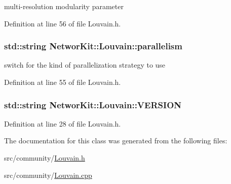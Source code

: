 multi-\/resolution modularity parameter 



Definition at line 56 of file Louvain.\-h.

\hypertarget{class_networ_kit_1_1_louvain_ad690b266426199e76caefd234ea53397}{
\subsubsection[{parallelism}]{\setlength{\rightskip}{0pt plus 5cm}std\-::string Networ\-Kit\-::\-Louvain\-::parallelism\hspace{0.3cm}{\ttfamily [protected]}}}\label{class_networ_kit_1_1_louvain_ad690b266426199e76caefd234ea53397}


switch for the kind of parallelization strategy to use 



Definition at line 55 of file Louvain.\-h.

\hypertarget{class_networ_kit_1_1_louvain_ae706eb92187681093cc5b3ff2f06c175}{
\subsubsection[{V\-E\-R\-S\-I\-O\-N}]{\setlength{\rightskip}{0pt plus 5cm}std\-::string Networ\-Kit\-::\-Louvain\-::\-V\-E\-R\-S\-I\-O\-N}}\label{class_networ_kit_1_1_louvain_ae706eb92187681093cc5b3ff2f06c175}


Definition at line 28 of file Louvain.\-h.



The documentation for this class was generated from the following files\-:\begin{DoxyCompactItemize}
\item 
src/community/\hyperlink{_louvain_8h}{Louvain.\-h}\item 
src/community/\hyperlink{_louvain_8cpp}{Louvain.\-cpp}\end{DoxyCompactItemize}
